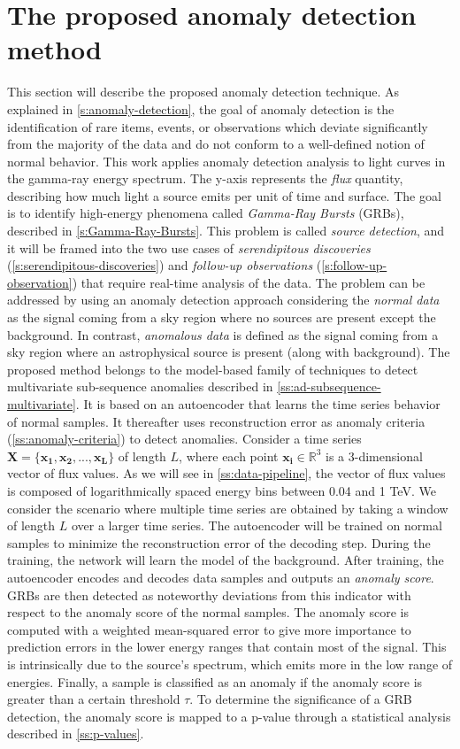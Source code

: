 \section{The proposed anomaly detection method}
\label{s:contribution}
This section will describe the proposed anomaly detection technique. As explained in \autoref{s:anomaly-detection}, the goal of anomaly detection is the identification of rare items, events, or observations which deviate significantly from the majority of the data and do not conform to a well-defined notion of normal behavior.
This work applies anomaly detection analysis to light curves in the gamma-ray energy spectrum. The y-axis represents the \textit{flux} quantity,  describing how much light a source emits per unit of time and surface. The goal is to identify high-energy phenomena called \textit{Gamma-Ray Bursts} (GRBs), described in \autoref{s:Gamma-Ray-Bursts}. This problem is called \textit{source detection}, and it will be framed into the two  use cases of \textit{serendipitous discoveries} (\autoref{s:serendipitous-discoveries}) and \textit{follow-up observations} (\autoref{s:follow-up-observation}) that require real-time analysis of the data. The problem can be addressed by using an anomaly detection approach considering the \textit{normal data} as the signal coming from a sky region where no sources are present except the background. In contrast, \textit{anomalous data} is defined as the signal coming from a sky region where an astrophysical source is present (along with background).
The proposed method belongs to the model-based family of techniques to detect multivariate sub-sequence anomalies described in \autoref{ss:ad-subsequence-multivariate}. It is based on an autoencoder that learns the time series behavior of normal samples. It thereafter uses reconstruction error as anomaly criteria (\autoref{ss:anomaly-criteria}) to detect anomalies. 
Consider a time series $\bm{X} = \{\bm{x_1}, \bm{x_2}, ..., \bm{x_L}\}$ of length $L$, where each point $\bm{x_i} \in \mathbb{R}^3$ is a 3-dimensional vector of flux values. As we will see in \autoref{ss:data-pipeline}, 
the vector of flux values is composed of logarithmically spaced energy bins between 0.04 and 1 TeV. We consider the scenario where multiple  time series are obtained by taking a window of length $L$ over a larger time series. The autoencoder will be trained on normal samples to minimize the reconstruction error of the decoding step. During the training, the network will learn the model of the background. After training, the autoencoder encodes and decodes data samples and outputs an \textit{anomaly score}. GRBs are then detected as noteworthy deviations from this indicator with respect to the anomaly score of the normal samples. The anomaly score is computed with a weighted mean-squared error to give more importance to prediction errors in the lower energy ranges that contain most of the signal. This is intrinsically due to the source's spectrum, which emits more in the low range of energies. Finally, a sample is classified as an anomaly if the anomaly score is greater than a certain threshold $\tau$. To determine the significance of a GRB detection, the anomaly score is mapped to a p-value through a statistical analysis described in \autoref{ss:p-values}. 

